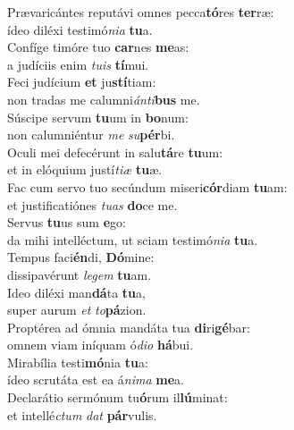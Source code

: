 \oddverse Prævaricántes reputávi omnes pecca\textbf{tó}res \textbf{ter}ræ:~\*\\
\oddverse ídeo diléxi testimó\textit{ni}\textit{a} \textbf{tu}a.\\
\evenverse Confíge timóre tuo \textbf{car}nes \textbf{me}as:~\*\\
\evenverse a judíciis enim \textit{tu}\textit{is} \textbf{tí}mui.\\
\oddverse Feci judícium \textbf{et} ju\textbf{stí}tiam:~\*\\
\oddverse non tradas me calumni\textit{án}\textit{ti}\textbf{bus} me.\\
\evenverse Súscipe servum \textbf{tu}um in \textbf{bo}num:~\*\\
\evenverse non calumniéntur \textit{me} \textit{su}\textbf{pér}bi.\\
\oddverse Oculi mei defecérunt in salu\textbf{tá}re \textbf{tu}um:~\*\\
\oddverse et in elóquium justí\textit{ti}\textit{æ} \textbf{tu}æ.\\
\evenverse Fac cum servo tuo secúndum miseri\textbf{cór}diam \textbf{tu}am:~\*\\
\evenverse et justificatiónes \textit{tu}\textit{as} \textbf{do}ce me.\\
\oddverse Servus \textbf{tu}us sum \textbf{e}go:~\*\\
\oddverse da mihi intelléctum, ut sciam testimó\textit{ni}\textit{a} \textbf{tu}a.\\
\evenverse Tempus faci\textbf{én}di, \textbf{Dó}mine:~\*\\
\evenverse dissipavérunt \textit{le}\textit{gem} \textbf{tu}am.\\
\oddverse Ideo diléxi man\textbf{dá}ta \textbf{tu}a,~\*\\
\oddverse super aurum \textit{et} \textit{to}\textbf{pá}zion.\\
\evenverse Proptérea ad ómnia mandáta tua \textbf{di}ri\textbf{gé}bar:~\*\\
\evenverse omnem viam iníquam ó\textit{di}\textit{o} \textbf{há}bui.\\
\oddverse Mirabília testi\textbf{mó}nia \textbf{tu}a:~\*\\
\oddverse ídeo scrutáta est ea á\textit{ni}\textit{ma} \textbf{me}a.\\
\evenverse Declarátio sermónum tu\textbf{ó}rum il\textbf{lú}minat:~\*\\
\evenverse et intellé\textit{ctum} \textit{dat} \textbf{pár}vulis.\\
